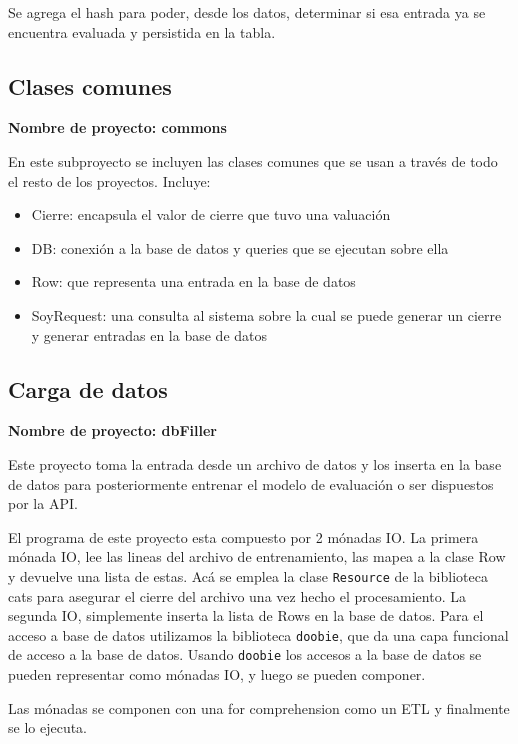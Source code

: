 \documentclass[10pt,spanish,a4paper,]{article}
\providecommand{\tightlist}{%
  \setlength{\itemsep}{0pt}\setlength{\parskip}{0pt}}
\begin{document}
Se agrega el hash para poder, desde los datos, determinar si esa entrada
ya se encuentra evaluada y persistida en la tabla.

\hypertarget{clases-comunes}{%
\subsection{Clases comunes}\label{clases-comunes}}

\textbf{Nombre de proyecto: commons}

En este subproyecto se incluyen las clases comunes que se usan a través
de todo el resto de los proyectos. Incluye:

\begin{itemize}
\tightlist
\item
  Cierre: encapsula el valor de cierre que tuvo una valuación
\item
  DB: conexión a la base de datos y queries que se ejecutan sobre ella
\item
  Row: que representa una entrada en la base de datos
\item
  SoyRequest: una consulta al sistema sobre la cual se puede generar un
  cierre y generar entradas en la base de datos
\end{itemize}

\hypertarget{carga-de-datos}{%
\subsection{Carga de datos}\label{carga-de-datos}}

\textbf{Nombre de proyecto: dbFiller}

Este proyecto toma la entrada desde un archivo de datos y los inserta en
la base de datos para posteriormente entrenar el modelo de evaluación o
ser dispuestos por la API.

El programa de este proyecto esta compuesto por 2 mónadas IO. La primera
mónada IO, lee las lineas del archivo de entrenamiento, las mapea a la
clase Row y devuelve una lista de estas. Acá se emplea la clase
\texttt{Resource} de la biblioteca cats para asegurar el cierre del
archivo una vez hecho el procesamiento. La segunda IO, simplemente
inserta la lista de Rows en la base de datos. Para el acceso a base de
datos utilizamos la biblioteca \texttt{doobie}, que da una capa
funcional de acceso a la base de datos. Usando \texttt{doobie} los
accesos a la base de datos se pueden representar como mónadas IO, y
luego se pueden componer.

Las mónadas se componen con una for comprehension como un ETL y
finalmente se lo ejecuta.
\end{document}
